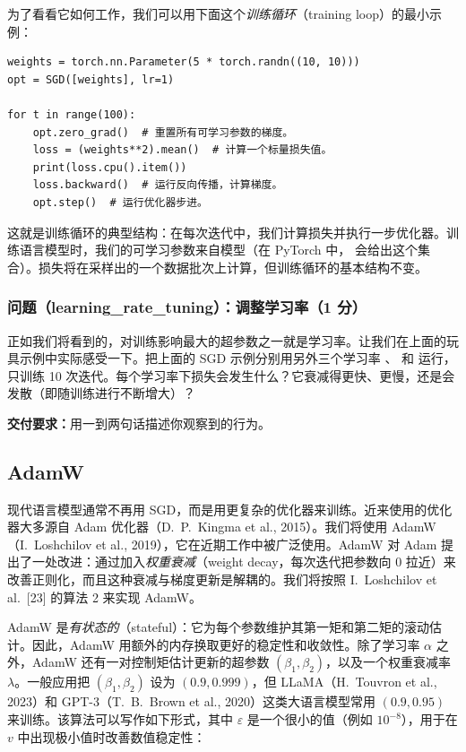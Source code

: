 为了看看它如何工作，我们可以用下面这个\textit{训练循环}（training loop）的最小示例：

\begin{lstlisting}
weights = torch.nn.Parameter(5 * torch.randn((10, 10)))
opt = SGD([weights], lr=1)

for t in range(100):
    opt.zero_grad()  # 重置所有可学习参数的梯度。
    loss = (weights**2).mean()  # 计算一个标量损失值。
    print(loss.cpu().item())
    loss.backward()  # 运行反向传播，计算梯度。
    opt.step()  # 运行优化器步进。
\end{lstlisting}

这就是训练循环的典型结构：在每次迭代中，我们计算损失并执行一步优化器。训练语言模型时，我们的可学习参数来自模型（在 PyTorch 中， 会给出这个集合）。损失将在采样出的一个数据批次上计算，但训练循环的基本结构不变。

\subsubsection*{问题（learning\_rate\_tuning）：调整学习率（1 分）}

正如我们将看到的，对训练影响最大的超参数之一就是学习率。让我们在上面的玩具示例中实际感受一下。把上面的 SGD 示例分别用另外三个学习率 、 和  运行，只训练 10 次迭代。每个学习率下损失会发生什么？它衰减得更快、更慢，还是会发散（即随训练进行不断增大）？

\textbf{交付要求：}用一到两句话描述你观察到的行为。

\subsection{AdamW}

现代语言模型通常不再用 SGD，而是用更复杂的优化器来训练。近来使用的优化器大多源自 Adam 优化器（D.~P.~Kingma et al., 2015）。我们将使用 AdamW（I.~Loshchilov et al., 2019），它在近期工作中被广泛使用。AdamW 对 Adam 提出了一处改进：通过加入\textit{权重衰减}（weight decay，每次迭代把参数向 0 拉近）来改善正则化，而且这种衰减与梯度更新是解耦的。我们将按照 I.~Loshchilov et al.~[23] 的算法 2 来实现 AdamW。

AdamW 是\textit{有状态的}（stateful）：它为每个参数维护其第一矩和第二矩的滚动估计。因此，AdamW 用额外的内存换取更好的稳定性和收敛性。除了学习率 $\alpha$ 之外，AdamW 还有一对控制矩估计更新的超参数 $(\beta_1, \beta_2)$，以及一个权重衰减率 $\lambda$。一般应用把 $(\beta_1, \beta_2)$ 设为 $(0.9, 0.999)$，但 LLaMA（H.~Touvron et al., 2023）和 GPT-3（T.~B.~Brown et al., 2020）这类大语言模型常用 $(0.9, 0.95)$ 来训练。该算法可以写作如下形式，其中 $\varepsilon$ 是一个很小的值（例如 $10^{-8}$），用于在 $v$ 中出现极小值时改善数值稳定性：

